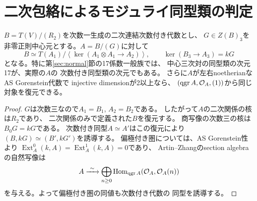 \section{二次包絡によるモジュライ同型類の判定}\label{sec:moduli-iso}
\begin{theorem}[三次商からのambient復元]\label{thm:moduli-iso}
$B=T(V)/(R_2)$を次数一生成の二次連結次数付き代数とし、
$G\in Z(B)_3$を非零正則中心元とする。$A=B/(G)$に対して
\begin{equation}\label{eq:moduli-envelope}
 B\simeq T(A_1)/
 \left\langle\ker(A_1\otimes A_1\longrightarrow A_2)\right\rangle,
 \qquad \ker(B_3\longrightarrow A_3)=kG
\end{equation}
となる。特に第\ref{sec:normal}節の17係数一般族では、
中心三次対の同型類の次元17が、実際の$A$の
次数付き同型類の次元でもある。
さらに$A$が左右noetherianなAS Gorenstein代数で
injective dimensionが2以上なら、
$(\operatorname{qgr} A,\mathcal O_A,(1))$から同じ対象を復元できる。
\end{theorem}
\begin{proof}
$G$は次数三なので$A_1=B_1$, $A_2=B_2$である。
したがって$A$の二次関係の核は$R_2$であり、
二次関係のみで定義された$B$を復元する。
商写像の次数三の核は$B_0G=kG$である。
次数付き同型$A\simeq A'$はこの復元により
$(B,kG)\simeq(B',kG')$を誘導する。
偏極付き圏については、AS Gorenstein性より
$\operatorname{Ext}_A^0(k,A)=\operatorname{Ext}_A^1(k,A)=0$であり、
Artin--Zhangのsection algebraの自然写像は
\begin{equation}\label{eq:moduli-section}
 A\xrightarrow{\ \sim\ }\bigoplus_{n\ge0}
 \operatorname{Hom}_{\operatorname{qgr} A}(\mathcal O_A,\mathcal O_A(n))
\end{equation}
を与える。よって偏極付き圏の同値も次数付き代数の
同型を誘導する。
\end{proof}
